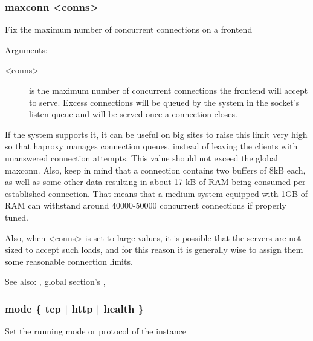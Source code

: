 \subsubsection[maxconn]{maxconn <conns>}
  Fix the maximum number of concurrent connections on a frontend


  Arguments:
\begin{description}
\item[<conns>]   is the maximum number of concurrent connections the frontend will
              accept to serve. Excess connections will be queued by the system
              in the socket's listen queue and will be served once a connection
              closes.

\end{description}

  If the system supports it, it can be useful on big sites to raise this limit
  very high so that haproxy manages connection queues, instead of leaving the
  clients with unanswered connection attempts. This value should not exceed the
  global maxconn. Also, keep in mind that a connection contains two buffers
  of 8kB each, as well as some other data resulting in about 17 kB of RAM being
  consumed per established connection. That means that a medium system equipped
  with 1GB of RAM can withstand around 40000-50000 concurrent connections if
  properly tuned.

  Also, when <conns> is set to large values, it is possible that the servers
  are not sized to accept such loads, and for this reason it is generally wise
  to assign them some reasonable connection limits.

  See also: , global section's , 

\subsubsection[mode]{mode \{ tcp | http | health \}}
  Set the running mode or protocol of the instance


